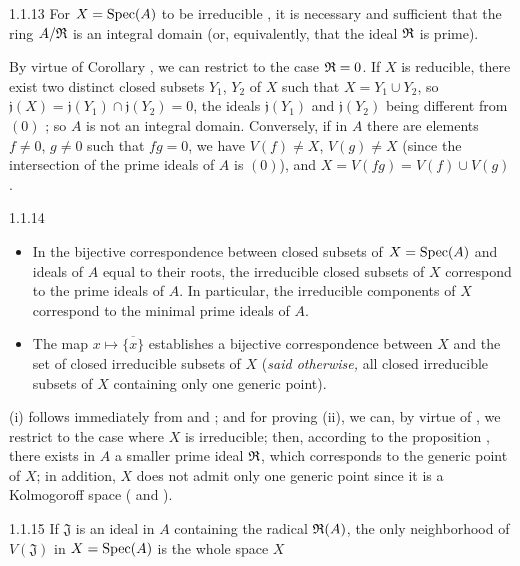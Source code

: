 \documentclass{book}
\begin{document}
\begin{envs}[Proposition]{1.1.13}
\label{prop-1.1.1.13}
For $X={\mathop{\mathrm{Spec}}\nolimits}(A)$ to be irreducible , it is necessary and sufficient that the ring $A/\mathfrak{R}$
is an integral domain (or, equivalently, that the ideal $\mathfrak{R}$ is prime).
\end{envs}

By virtue of Corollary , we can restrict to the case $\mathfrak{R}=0$. If $X$ is reducible,
there exist two distinct closed subsets $Y_1$, $Y_2$ of $X$ such that $X=Y_1\cup Y_2$, so
$\mathfrak{j}(X)=\mathfrak{j}(Y_1)\cap\mathfrak{j}(Y_2)=0$, the ideals $\mathfrak{j}(Y_1)$ and
$\mathfrak{j}(Y_2)$ being different from $(0)$ ; so $A$ is not an integral domain.
Conversely, if in $A$ there are elements $f\neq 0$, $g\neq 0$ such that $fg=0$, we have
$V(f)\neq X$, $V(g)\neq X$ (since the intersection of the prime ideals of $A$ is $(0)$), and
$X=V(fg)=V(f)\cup V(g)$.

\begin{envs}[Corollary]{1.1.14}
\label{cor-1.1.1.14}
\begin{itemize}
  \item[(i)] In the bijective correspondence between closed subsets of $X={\mathop{\mathrm{Spec}}\nolimits}(A)$
             and ideals of $A$ equal to their roots, the irreducible closed subsets
             of $X$ correspond to the prime ideals of $A$. In particular, the irreducible
             components of $X$ correspond to the minimal prime ideals of $A$.
  \item[(ii)] The map $x\mapsto\overline{\{x\}}$ establishes a bijective correspondence
              between $X$ and the set of closed irreducible subsets of $X$
              (\emph{said otherwise,} all closed irreducible subsets of $X$ containing
              only one generic point).
\end{itemize}
\end{envs}

(i) follows immediately from  and ; and for
proving (ii), we can, by virtue of , we restrict to the case where
$X$ is irreducible; then, according to the proposition , there exists
in $A$ a smaller prime ideal $\mathfrak{R}$, which corresponds to the generic point
of $X$; in addition, $X$ does not admit only one generic point since it is
a Kolmogoroff space ( and ).

\begin{envs}[Proposition]{1.1.15}
\label{prop-1.1.1.15}
If $\mathfrak{J}$ is an ideal in $A$ containing the radical $\mathfrak{R}(A)$, the only
neighborhood of $V(\mathfrak{J})$ in $X={\mathop{\mathrm{Spec}}\nolimits}(A)$ is the whole space $X$
\end{envs}
\end{document}
